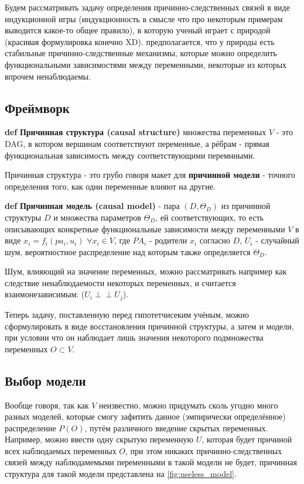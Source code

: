\documentclass[fleqn]{article}
\newcommand{\independent}{\perp \!\!\! \perp}
\def\define#1{\textbf{def} \textbf{#1}}
\begin{document}
Будем рассматривать задачу определения причинно-следственных связей в виде индукционной игры (индукционность в смысле что про некоторым примерам выводится какое-то общее правило), в которую ученый играет с природой (красивая формулировка конечно XD). предполагается, что у природы есть стабильные причинно-следственные механизмы, которые можно определить функциональными зависимостями между переменными, некоторые из которых впрочем ненаблюдаемы.

\subsection*{Фреймворк}

\define{Причинная структура (causal structure)} множества переменных $V$ - это DAG, в котором вершинам соответствуют переменные, а рёбрам - прямая функциональная зависимость между соответствующими перемнными.

Причинная структура - это грубо говоря макет для \textbf{причинной модели} - точного определения того, как одни переменные влияют на другие.

\define{Причинная модель (causal model)}  - пара $(D, \Theta_D)$ из причинной структуры $D$ и множества параметров $\Theta_D$, ей соответствующих, то есть описывающих конкретные функциональные зависимости между переменными $V$ в виде $x_i = f_i(pa_i, u_i)$ $\forall x_i \in V$, где $PA_i$ - родители $x_i$ согласно $D$, $U_i$ - случайный шум, вероятностное распределение над которым также определяется $\Theta_D$.

Шум, влияющий на значение переменных, можно рассматривать например как следствие ненаблюдаемости некоторых переменных, и считается взаимонезависимым: ($U_i \independent U_j$).

Теперь задачу, поставленную перед гипотетчисеким учёным, можно сформулировать в виде восстановления причинной структуры, а затем и модели, при условии что он наблюдает лишь значения некоторого подмножества переменных $O \subset V$.

\subsection*{Выбор модели}

Вообще говоря, так как $V$ неизвестно, можно придумать сколь угодно много разных моделей, которые смогу зафитить данное (эмпирически определённое) распределение $P(O)$, путём различного введение скрытых переменных. Например, можно ввести одну скрытую переменную $U$, которая будет причиной всех наблюдаемых переменных $O$, при этом никаких причинно-следственных связей между наблюдамемыми переменными в такой модели не будет, причинная структура для такой модели представлена на \ref{fig:useless_model}.
\end{document}

